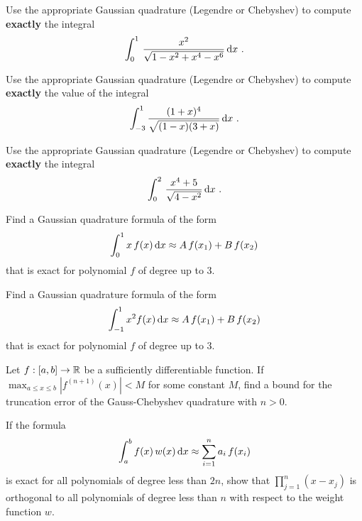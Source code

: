 \begin{question}
Use the appropriate Gaussian quadrature (Legendre or Chebyshev) to
compute {\bfseries exactly} the integral
\[
\int_0^1\,\frac{x^2}{\sqrt{1-x^2+x^4-x^6}}\,\mathrm{d}x \ .
\]
\label{diffQ33}
\end{question}

\begin{question}
Use the appropriate Gaussian quadrature (Legendre or Chebyshev) to 
compute {\bfseries exactly} the value of the integral
\[
\int_{-3}^1 \frac{(1+x)^4}{\sqrt{(1-x)(3+x)}} \,\mathrm{d}x \ .
\]
\label{diffQ34}
\end{question}

\begin{question}
Use the appropriate Gaussian quadrature (Legendre or Chebyshev) to
compute {\bfseries exactly} the integral
\[
\int_0^2\,\frac{x^4+5}{\sqrt{4-x^2}} \dx{x} \ .
\]
\label{diffQ35}
\end{question}

\begin{question}
Find a Gaussian quadrature formula of the form
\begin{equation}\label{quadFormQuest1}
\int_0^1 x\,f(x)\,\mathrm{d}x \approx A\,f(x_1) + B\,f(x_2)
\end{equation}
that is exact for polynomial $f$ of degree up to $3$.
\label{diffQ36}
\end{question}

\begin{question}
Find a Gaussian quadrature formula of the form
\begin{equation}\label{quadFormQuest2}
\int_{-1}^1 x^2 f(x)\,\mathrm{d}x \approx A\,f(x_1) + B\,f(x_2)
\end{equation}
that is exact for polynomial $f$ of degree up to $3$.
\label{diffQ37}
\end{question}

\begin{question}
Let $f:[a,b]\rightarrow \mathbb{R}$ be a sufficiently differentiable
function.  If
$\displaystyle \max_{a\leq x \leq b} |f^{(n+1)}(x)| < M$ for some
constant $M$, find a bound for the truncation error of
the Gauss-Chebyshev quadrature with $n>0$.
\label{diffQ38}
\end{question}

\begin{question}
If the formula
\[
\int_a^b f(x)\,w(x)\,\mathrm{d}x \approx \sum_{i=1}^n a_i \,f(x_i)
\]
is exact for all polynomials of degree less than $2n$, show that
$\displaystyle \prod_{j=1}^n (x-x_j)$ is orthogonal to all polynomials
of degree less than $n$ with respect to the weight function $w$.
\label{diffQ39}
\end{question}

